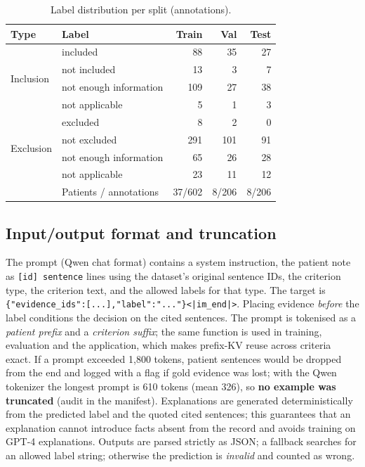 \documentclass[conference]{IEEEtran}
\begin{document}
\begin{table}[t]\centering\caption{Label distribution per split (annotations).}\label{tab:data}
\begin{tabular}{llrrr}\toprule
Type & Label & Train & Val & Test\\\midrule
\multirow{4}{*}{Inclusion} & included & 88 & 35 & 27\\
 & not included & 13 & 3 & 7\\
 & not enough information & 109 & 27 & 38\\
 & not applicable & 5 & 1 & 3\\\midrule
\multirow{4}{*}{Exclusion} & excluded & 8 & 2 & 0\\
 & not excluded & 291 & 101 & 91\\
 & not enough information & 65 & 26 & 28\\
 & not applicable & 23 & 11 & 12\\\midrule
 & Patients / annotations & 37/602 & 8/206 & 8/206\\\bottomrule
\end{tabular}\end{table}

\subsection{Input/output format and truncation}
The prompt (Qwen chat format) contains a system instruction, the patient note as \texttt{[id] sentence} lines using the dataset's original sentence IDs, the criterion type, the criterion text, and the allowed labels for that type. The target is \verb!{"evidence_ids":[...],"label":"..."}<|im_end|>!. Placing evidence \emph{before} the label conditions the decision on the cited sentences. The prompt is tokenised as a \emph{patient prefix} and a \emph{criterion suffix}; the same function is used in training, evaluation and the application, which makes prefix-KV reuse across criteria exact. If a prompt exceeded 1{,}800 tokens, patient sentences would be dropped from the end and logged with a flag if gold evidence was lost; with the Qwen tokenizer the longest prompt is 610 tokens (mean 326), so \textbf{no example was truncated} (audit in the manifest). Explanations are generated deterministically from the predicted label and the quoted cited sentences; this guarantees that an explanation cannot introduce facts absent from the record and avoids training on GPT-4 explanations. Outputs are parsed strictly as JSON; a fallback searches for an allowed label string; otherwise the prediction is \emph{invalid} and counted as wrong.
\end{document}
